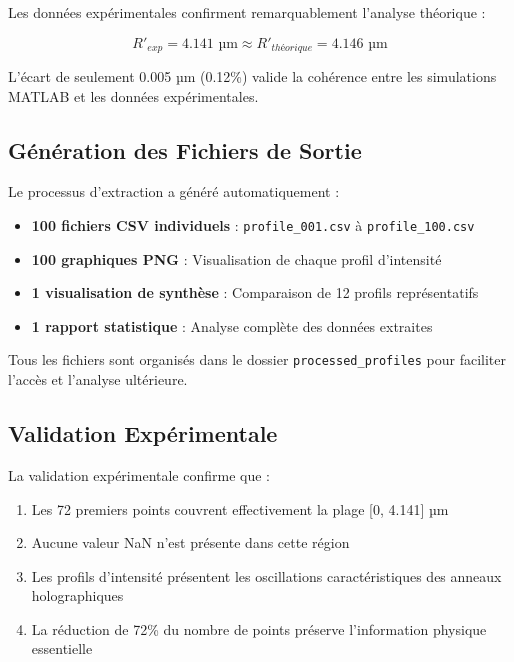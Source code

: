 \documentclass[twocolumn,10pt]{article}
\begin{document}
Les données expérimentales confirment remarquablement l'analyse théorique :

\begin{equation}
R'_{exp} = 4.141 \text{ µm} \approx R'_{théorique} = 4.146 \text{ µm}
\end{equation}

L'écart de seulement 0.005 µm (0.12\%) valide la cohérence entre les simulations MATLAB et les données expérimentales.

\subsection{Génération des Fichiers de Sortie}

Le processus d'extraction a généré automatiquement :

\begin{itemize}
\item \textbf{100 fichiers CSV individuels} : \texttt{profile\_001.csv} à \texttt{profile\_100.csv}
\item \textbf{100 graphiques PNG} : Visualisation de chaque profil d'intensité
\item \textbf{1 visualisation de synthèse} : Comparaison de 12 profils représentatifs
\item \textbf{1 rapport statistique} : Analyse complète des données extraites
\end{itemize}

Tous les fichiers sont organisés dans le dossier \texttt{processed\_profiles} pour faciliter l'accès et l'analyse ultérieure.

\subsection{Validation Expérimentale}

La validation expérimentale confirme que :

\begin{enumerate}
\item Les 72 premiers points couvrent effectivement la plage [0, 4.141] µm
\item Aucune valeur NaN n'est présente dans cette région
\item Les profils d'intensité présentent les oscillations caractéristiques des anneaux holographiques
\item La réduction de 72\% du nombre de points préserve l'information physique essentielle
\end{enumerate}
\end{document}
